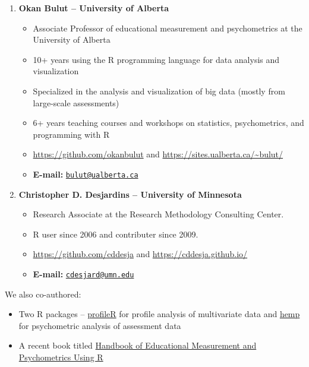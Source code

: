 \documentclass[
]{book}
\providecommand{\tightlist}{%
  \setlength{\itemsep}{0pt}\setlength{\parskip}{0pt}}
\begin{document}
\begin{enumerate}
\def\labelenumi{\arabic{enumi}.}
\item
  \textbf{Okan Bulut -- University of Alberta}

  \begin{itemize}
  \tightlist
  \item
    Associate Professor of educational measurement and psychometrics at the University of Alberta
  \item
    10+ years using the R programming language for data analysis and visualization
  \item
    Specialized in the analysis and visualization of big data (mostly from large-scale assessments)
  \item
    6+ years teaching courses and workshops on statistics, psychometrics, and programming with R
  \item
    \url{https://github.com/okanbulut} and \url{https://sites.ualberta.ca/~bulut/}
  \item
    \textbf{E-mail:} \href{mailto:bulut@ualberta.ca}{\nolinkurl{bulut@ualberta.ca}}
  \end{itemize}
\item
  \textbf{Christopher D. Desjardins -- University of Minnesota}

  \begin{itemize}
  \tightlist
  \item
    Research Associate at the Research Methodology Consulting Center.
  \item
    R user since 2006 and contributer since 2009.
  \item
    \url{https://github.com/cddesja} and \url{https://cddesja.github.io/}
  \item
    \textbf{E-mail:} \href{mailto:cdesjard@umn.edu}{\nolinkurl{cdesjard@umn.edu}}
  \end{itemize}
\end{enumerate}

We also co-authored:

\begin{itemize}
\tightlist
\item
  Two R packages -- \href{https://cran.r-project.org/web/packages/profileR/index.html}{profileR} for profile analysis of multivariate data and \href{https://github.com/cddesja/hemp}{hemp} for psychometric analysis of assessment data
\item
  A recent book titled \href{https://www.crcpress.com/Handbook-of-Educational-Measurement-and-Psychometrics-Using-R/Desjardins-Bulut/p/book/9781498770132}{Handbook of Educational Measurement and Psychometrics Using R}
\end{itemize}
\end{document}
